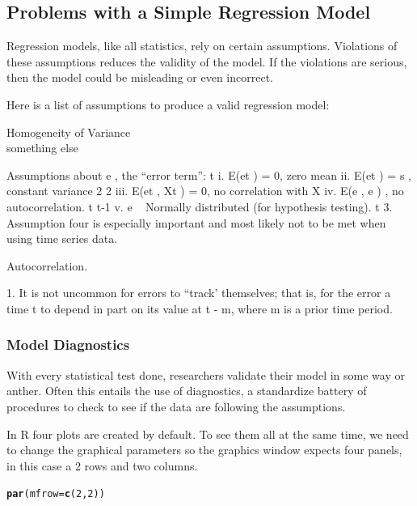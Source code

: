 \documentclass{article}\usepackage[]{graphicx}\usepackage[]{color}
\makeatletter
\newcommand{\hlnum}[1]{\textcolor[rgb]{0.686,0.059,0.569}{#1}}%
\newcommand{\hlstd}[1]{\textcolor[rgb]{0.345,0.345,0.345}{#1}}%
\newcommand{\hlkwc}[1]{\textcolor[rgb]{0.333,0.667,0.333}{#1}}%
\newcommand{\hlkwd}[1]{\textcolor[rgb]{0.737,0.353,0.396}{\textbf{#1}}}%
\newenvironment{kframe}{%
 \def\at@end@of@kframe{}%
 \ifinner\ifhmode%
  \def\at@end@of@kframe{\end{minipage}}%
  \begin{minipage}{\columnwidth}%
 \fi\fi%
 \def\FrameCommand##1{\hskip\@totalleftmargin \hskip-\fboxsep
 \colorbox{shadecolor}{##1}\hskip-\fboxsep
     \hskip-\linewidth \hskip-\@totalleftmargin \hskip\columnwidth}%
 \MakeFramed {\advance\hsize-\width
   \@totalleftmargin\z@ \linewidth\hsize
   \@setminipage}}%
 {\par\unskip\endMakeFramed%
 \at@end@of@kframe}
\newenvironment{knitrout}{}{} %
\makeatother
\begin{document}
\subsection{Problems with a Simple Regression Model}

Regression models, like all statistics, rely on certain assumptions. Violations of these assumptions reduces the validity of the model. If the violations are serious, then the model could be misleading or even incorrect.

Here is a list of assumptions to produce a valid regression model:

\begin{description}
  \item[Homogeneity of Variance]
  \item[something else]
\end{description}

Assumptions about e , the “error term”: t
i. E(et
) = 0, zero mean
ii. E(et
) = s , constant variance 2 2
iii. E(et
, Xt
) = 0, no correlation with X 
iv. E(e , e ) , no autocorrelation. t t-1
v. e ~ Normally distributed (for hypothesis testing). t
3. Assumption four is especially important and most likely not to be met when
using time series data.

Autocorrelation.

1. It is not uncommon for errors to “track’ themselves; that is, for the error a time t to depend in part on its value at t - m, where m is a prior time period.

\subsubsection{Model Diagnostics}

With every statistical test done, researchers validate their model in some way or anther. Often this entails the use of diagnostics, a standardize battery of procedures to check to see if the data are following the assumptions. 

In R four plots are created by default.  To see them all at the same time, we need to change the graphical parameters so the graphics window expects four panels, in this case a 2 rows and two columns. 

\begin{knitrout}
\color{fgcolor}\begin{kframe}
\begin{alltt}
\hlkwd{par}\hlstd{(}\hlkwc{mfrow}\hlstd{=}\hlkwd{c}\hlstd{(}\hlnum{2}\hlstd{,}\hlnum{2}\hlstd{))}
\end{alltt}
\end{kframe}
\end{knitrout}
\end{document}
